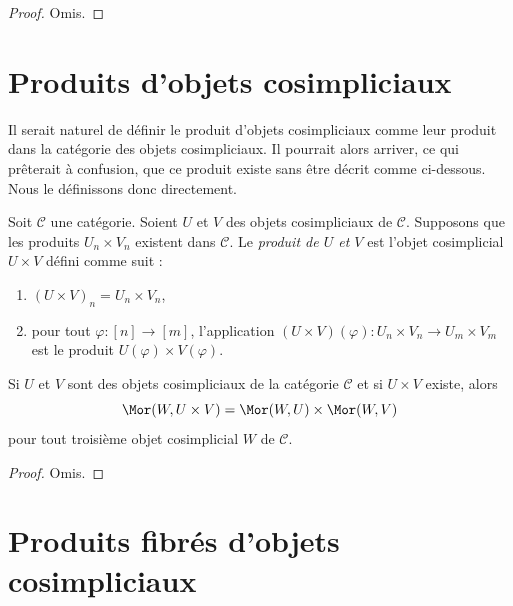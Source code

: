 \begin{proof}
Omis.
\end{proof}











\section{Produits d'objets cosimpliciaux}
\label{section-products-cosimplicial}

\noindent
Il serait naturel de définir le produit d'objets cosimpliciaux comme leur
produit dans la catégorie des objets cosimpliciaux. Il pourrait alors
arriver, ce qui prêterait à confusion, que ce produit existe sans être
décrit comme ci-dessous. Nous le définissons donc directement.

\begin{definition}
\label{definition-product-cosimplicial-objects}
Soit $\mathcal{C}$ une catégorie. Soient $U$ et $V$ des objets
cosimpliciaux de $\mathcal{C}$. Supposons que les produits
$U_n \times V_n$ existent dans $\mathcal{C}$. Le {\it produit de $U$ et
$V$} est l'objet cosimplicial $U \times V$ défini comme suit :
\begin{enumerate}
\item $(U \times V)_n = U_n \times V_n$,
\item pour tout $\varphi : [n] \to [m]$, l'application
$(U \times V)(\varphi) : U_n \times V_n \to U_m \times V_m$
est le produit $U(\varphi) \times V(\varphi)$.
\end{enumerate}
\end{definition}

\begin{lemma}
\label{lemma-product-cosimplicial-objects}
Si $U$ et $V$ sont des objets cosimpliciaux de la catégorie $\mathcal{C}$
et si $U \times V$ existe, alors
$$
\Mor(W, U \times V) =
\Mor(W, U) \times
\Mor(W, V)
$$
pour tout troisième objet cosimplicial $W$ de $\mathcal{C}$.
\end{lemma}

\begin{proof}
Omis.
\end{proof}

\section{Produits fibrés d'objets cosimpliciaux}
\label{section-fibre-products-cosimplicial}

